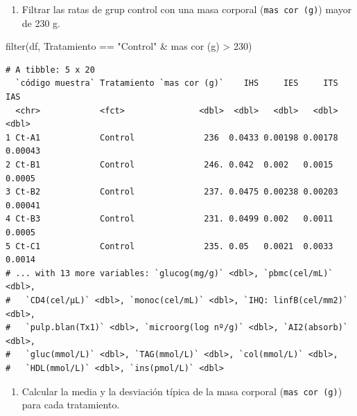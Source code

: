 \documentclass[
  a4paper,
]{scrreport}
\newenvironment{Shaded}{\begin{snugshade}}{\end{snugshade}}
\newcommand{\AttributeTok}[1]{\textcolor[rgb]{0.40,0.45,0.13}{#1}}
\newcommand{\DecValTok}[1]{\textcolor[rgb]{0.68,0.00,0.00}{#1}}
\newcommand{\FunctionTok}[1]{\textcolor[rgb]{0.28,0.35,0.67}{#1}}
\newcommand{\NormalTok}[1]{\textcolor[rgb]{0.00,0.23,0.31}{#1}}
\newcommand{\SpecialCharTok}[1]{\textcolor[rgb]{0.37,0.37,0.37}{#1}}
\newcommand{\StringTok}[1]{\textcolor[rgb]{0.13,0.47,0.30}{#1}}
\providecommand{\tightlist}{%
  \setlength{\itemsep}{0pt}\setlength{\parskip}{0pt}}\usepackage{longtable,booktabs,array}
\theoremstyle{definition}
\theoremstyle{definition}
\theoremstyle{remark}
\begin{document}
\begin{enumerate}
\def\labelenumi{\alph{enumi}.}
\setcounter{enumi}{3}
\tightlist
\item
  Filtrar las ratas de grup control con una masa corporal
  (\texttt{mas\ cor\ (g)}) mayor de 230 g.
\end{enumerate}

\begin{tcolorbox}[enhanced jigsaw, rightrule=.15mm, titlerule=0mm, colbacktitle=quarto-callout-note-color!10!white, toprule=.15mm, coltitle=black, bottomtitle=1mm, opacityback=0, toptitle=1mm, title=\textcolor{quarto-callout-note-color}{\faInfo}\hspace{0.5em}{Solución}, left=2mm, colback=white, breakable, colframe=quarto-callout-note-color-frame, leftrule=.75mm, opacitybacktitle=0.6, arc=.35mm, bottomrule=.15mm]

\begin{Shaded}
\begin{Highlighting}[]
\FunctionTok{filter}\NormalTok{(df, Tratamiento }\SpecialCharTok{==} \StringTok{"Control"} \SpecialCharTok{\&} \StringTok{\textasciigrave{}}\AttributeTok{mas cor (g)}\StringTok{\textasciigrave{}} \SpecialCharTok{\textgreater{}} \DecValTok{230}\NormalTok{)}
\end{Highlighting}
\end{Shaded}

\begin{verbatim}
# A tibble: 5 x 20
  `código muestra` Tratamiento `mas cor (g)`    IHS     IES     ITS     IAS
  <chr>            <fct>               <dbl>  <dbl>   <dbl>   <dbl>   <dbl>
1 Ct-A1            Control              236  0.0433 0.00198 0.00178 0.00043
2 Ct-B1            Control              246. 0.042  0.002   0.0015  0.0005 
3 Ct-B2            Control              237. 0.0475 0.00238 0.00203 0.00041
4 Ct-B3            Control              231. 0.0499 0.002   0.0011  0.0005 
5 Ct-C1            Control              235. 0.05   0.0021  0.0033  0.0014 
# ... with 13 more variables: `glucog(mg/g)` <dbl>, `pbmc(cel/mL)` <dbl>,
#   `CD4(cel/µL)` <dbl>, `monoc(cel/mL)` <dbl>, `IHQ: linfB(cel/mm2)` <dbl>,
#   `pulp.blan(Tx1)` <dbl>, `microorg(log nº/g)` <dbl>, `AI2(absorb)` <dbl>,
#   `gluc(mmol/L)` <dbl>, `TAG(mmol/L)` <dbl>, `col(mmol/L)` <dbl>,
#   `HDL(mmol/L)` <dbl>, `ins(pmol/L)` <dbl>
\end{verbatim}

\end{tcolorbox}

\begin{enumerate}
\def\labelenumi{\alph{enumi}.}
\setcounter{enumi}{4}
\tightlist
\item
  Calcular la media y la desviación típica de la masa corporal
  (\texttt{mas\ cor\ (g)}) para cada tratamiento.
\end{enumerate}
\end{document}
